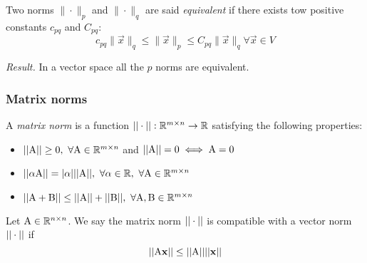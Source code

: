 
\begin{definition}
    Two norms $\|{\cdot}\|_p $ and $\|{\cdot}\|_q $ are said \textit{equivalent} if there exists tow positive constants $c_{pq}$ and $C_{pq}$:
    $$c_{pq} \|\vec{x}\|_q\leq \|\vec{x}\|_p \leq C_{pq}\|\vec{x}\|_q \forall \vec{x} \in V$$
\end{definition}

\textit{Result.} In a vector space all the $p$ norms are equivalent.

\subsubsection{Matrix norms}

\begin{definition}
    A \textit{matrix norm} is a function $||\cdot||: \mathbb{R}^{m \times n} \rightarrow \mathbb{R}$ satisfying the following properties:
    \begin{itemize}
        \item $||\mathrm{A}|| \geq 0,\ \forall \mathrm{A} \in \mathbb{R}^{m \times n}$ and $||\mathrm{A}|| = 0 \iff \mathrm{A} = \mathrm{0}$
        \item $||\alpha\mathrm{A}|| = |\alpha|||\mathrm{A}||,\ \forall \alpha \in \mathbb{R},\ \forall \mathrm{A} \in \mathbb{R}^{m \times n}$
        \item $||\mathrm{A} + \mathrm{B}|| \leq ||\mathrm{A}|| + ||\mathrm{B}||,\ \forall \mathrm{A}, \mathrm{B} \in \mathbb{R}^{m \times n}$
    \end{itemize}
\end{definition}

\begin{definition}
    Let $\mathrm{A} \in \mathbb{R}^{n \times n}$. We say the matrix norm $||\cdot||$ is compatible with a vector norm $||\cdot||$ if
    $$||\mathrm{A}\mathbf{x}|| \leq ||\mathrm{A}||||\mathbf{x}||$$
\end{definition}









 
